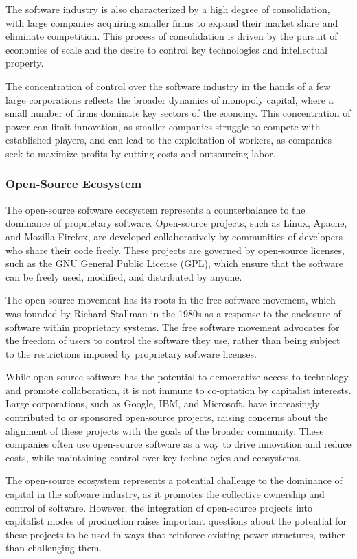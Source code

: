 \begin{refsection}
\begin{multicols}{2}
{The software industry is also characterized by a high degree of consolidation, with large companies acquiring smaller firms to expand their market share and eliminate competition. This process of consolidation is driven by the pursuit of economies of scale and the desire to control key technologies and intellectual property.

The concentration of control over the software industry in the hands of a few large corporations reflects the broader dynamics of monopoly capital, where a small number of firms dominate key sectors of the economy. This concentration of power can limit innovation, as smaller companies struggle to compete with established players, and can lead to the exploitation of workers, as companies seek to maximize profits by cutting costs and outsourcing labor.

\subsubsection{Open-Source Ecosystem}

The open-source software ecosystem represents a counterbalance to the dominance of proprietary software. Open-source projects, such as Linux, Apache, and Mozilla Firefox, are developed collaboratively by communities of developers who share their code freely. These projects are governed by open-source licenses, such as the GNU General Public License (GPL), which ensure that the software can be freely used, modified, and distributed by anyone.

The open-source movement has its roots in the free software movement, which was founded by Richard Stallman in the 1980s as a response to the enclosure of software within proprietary systems. The free software movement advocates for the freedom of users to control the software they use, rather than being subject to the restrictions imposed by proprietary software licenses.

While open-source software has the potential to democratize access to technology and promote collaboration, it is not immune to co-optation by capitalist interests. Large corporations, such as Google, IBM, and Microsoft, have increasingly contributed to or sponsored open-source projects, raising concerns about the alignment of these projects with the goals of the broader community. These companies often use open-source software as a way to drive innovation and reduce costs, while maintaining control over key technologies and ecosystems.

The open-source ecosystem represents a potential challenge to the dominance of capital in the software industry, as it promotes the collective ownership and control of software. However, the integration of open-source projects into capitalist modes of production raises important questions about the potential for these projects to be used in ways that reinforce existing power structures, rather than challenging them.

}
\end{multicols}
\end{refsection}
